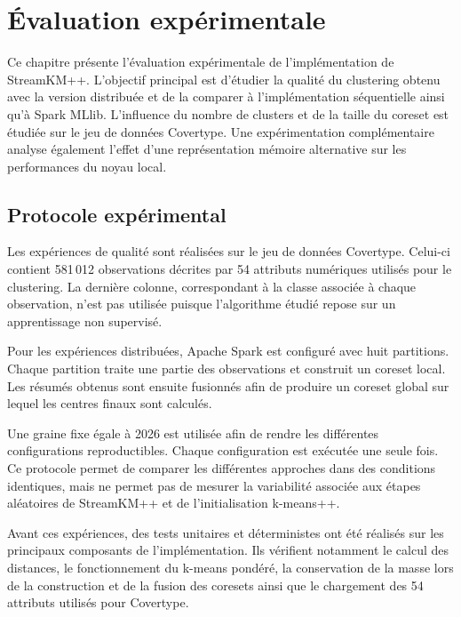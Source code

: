 
\chapter{Évaluation expérimentale}
\label{ch:evaluation}

Ce chapitre présente l'évaluation expérimentale de l'implémentation de StreamKM++. L'objectif principal est d'étudier la qualité du clustering obtenu avec la version distribuée et de la comparer à l'implémentation séquentielle ainsi qu'à Spark MLlib. L'influence du nombre de clusters et de la taille du coreset est étudiée sur le jeu de données Covertype. Une expérimentation complémentaire analyse également l'effet d'une représentation mémoire alternative sur les performances du noyau local.

\section{Protocole expérimental}
\label{sec:eval-protocole}

Les expériences de qualité sont réalisées sur le jeu de données Covertype. Celui-ci contient 581\,012 observations décrites par 54 attributs numériques utilisés pour le clustering. La dernière colonne, correspondant à la classe associée à chaque observation, n'est pas utilisée puisque l'algorithme étudié repose sur un apprentissage non supervisé.

Pour les expériences distribuées, Apache Spark est configuré avec huit partitions. Chaque partition traite une partie des observations et construit un coreset local. Les résumés obtenus sont ensuite fusionnés afin de produire un coreset global sur lequel les centres finaux sont calculés.

Une graine fixe égale à 2026 est utilisée afin de rendre les différentes configurations reproductibles. Chaque configuration est exécutée une seule fois. Ce protocole permet de comparer les différentes approches dans des conditions identiques, mais ne permet pas de mesurer la variabilité associée aux étapes aléatoires de StreamKM++ et de l'initialisation k-means++.

Avant ces expériences, des tests unitaires et déterministes ont été réalisés sur les principaux composants de l'implémentation. Ils vérifient notamment le calcul des distances, le fonctionnement du k-means pondéré, la conservation de la masse lors de la construction et de la fusion des coresets ainsi que le chargement des 54 attributs utilisés pour Covertype.

